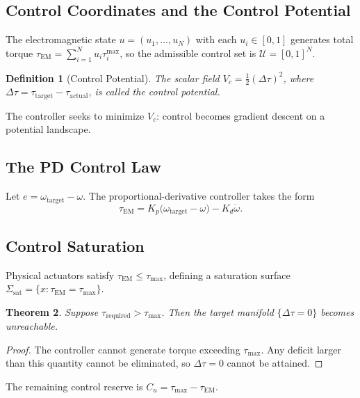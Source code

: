 \documentclass[12pt,a4paper]{article}
\newtheorem{theorem}{Theorem}[section]
\newtheorem{definition}[theorem]{Definition}
\begin{document}
\subsection{Control Coordinates and the Control Potential}

The electromagnetic state $u = (u_1, \ldots, u_N)$ with each $u_i \in [0,1]$ generates total torque $\tau_{\mathrm{EM}} = \sum_{i=1}^{N} u_i \tau_i^{\max}$, so the admissible control set is $\mathcal{U} = [0,1]^N$.

\begin{definition}[Control Potential]
The scalar field $V_c = \tfrac{1}{2}(\Delta\tau)^2$, where $\Delta\tau = \tau_{\mathrm{target}} - \tau_{\mathrm{actual}}$, is called the \emph{control potential}.
\end{definition}

The controller seeks to minimize $V_c$: control becomes gradient descent on a potential landscape.

\subsection{The PD Control Law}

Let $e = \omega_{\mathrm{target}} - \omega$. The proportional-derivative controller takes the form
\[
\tau_{\mathrm{EM}} = K_p\bigl(\omega_{\mathrm{target}} - \omega\bigr) - K_d \dot\omega.
\]

\subsection{Control Saturation}

Physical actuators satisfy $\tau_{\mathrm{EM}} \le \tau_{\max}$, defining a saturation surface $\Sigma_{\mathrm{sat}} = \{ x : \tau_{\mathrm{EM}} = \tau_{\max} \}$.

\begin{theorem}
Suppose $\tau_{\mathrm{required}} > \tau_{\max}$. Then the target manifold $\{\Delta\tau = 0\}$ becomes unreachable.
\end{theorem}

\begin{proof}
The controller cannot generate torque exceeding $\tau_{\max}$. Any deficit larger than this quantity cannot be eliminated, so $\Delta\tau = 0$ cannot be attained.
\end{proof}

The remaining control reserve is $C_u = \tau_{\max} - \tau_{\mathrm{EM}}$.

\end{document}
